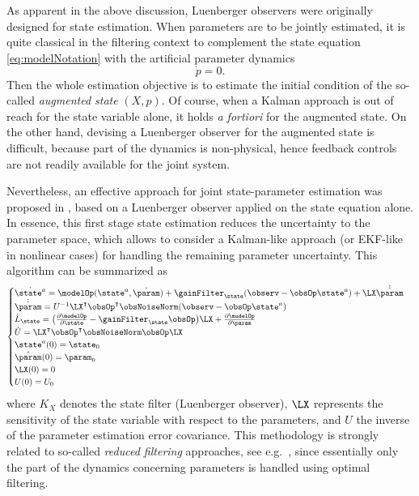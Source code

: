 \documentclass{tufte-book}
\begin{document}
As apparent in the above discussion, Luenberger observers were originally designed for state estimation. When parameters are to be jointly estimated, it is quite classical in the filtering context to complement the state equation \eqref{eq:modelNotation} with the artificial parameter dynamics
\begin{equation}
	\dot{p} = 0.
\end{equation}
Then the whole estimation objective is to estimate the initial condition of the so-called \emph{augmented state} $(X,p)$. Of course, when a Kalman approach is out of reach for the state variable alone, it holds \emph{a fortiori} for the augmented state. On the other hand, devising a Luenberger observer for the augmented state is difficult, because part of the dynamics is non-physical, hence feedback controls are not readily available for the joint system.

Nevertheless, an effective approach for joint state-parameter estimation was proposed in \cite{PM-DC-PLT-08}, based on a Luenberger observer applied on the state equation alone. In essence, this first stage state estimation reduces the uncertainty to the parameter space, which allows to consider a Kalman-like approach (or EKF-like in nonlinear cases) for handling the remaining parameter uncertainty. This algorithm can be summarized as
\begin{equation}\label{eq:jointEst}
	\begin{cases}
			\dot{\state^a} = \modelOp(\state^a,\hat{\param}) + \gainFilter_\state(\observ-\obsOp\state^a) + \LX\dot{\hat{\param}}\\
			\dot{\hat{\param}} = U^{-1} {\LX}^\intercal \obsOp^\intercal \obsNoiseNorm (\observ-\obsOp\state^a) \\
			\dot{L}_\state = \bigl( \frac{\partial \modelOp}{\partial \state} - \gainFilter_\state\obsOp \bigr) \LX + \frac{\partial \modelOp}{\partial \param}\\
			\dot{U} = {\LX}^\intercal \obsOp^\intercal \obsNoiseNorm \obsOp \LX \\
			\state^a(0) = \state_0\\
			\hat{\param}(0) = \param_0 \\
			\LX(0) = 0 \\
			U(0) = U_0
	\end{cases}
\end{equation}
where $K_X$ denotes the state filter (Luenberger observer), $\LX$ represents the sensitivity of the state variable with respect to the parameters, and $U$ the inverse of the parameter estimation error covariance. This methodology is strongly related to so-called \emph{reduced filtering} approaches, see e.g.~\cite{Pham:1998p44}, since essentially only the part of the dynamics concerning parameters is handled using optimal filtering.
\end{document}
